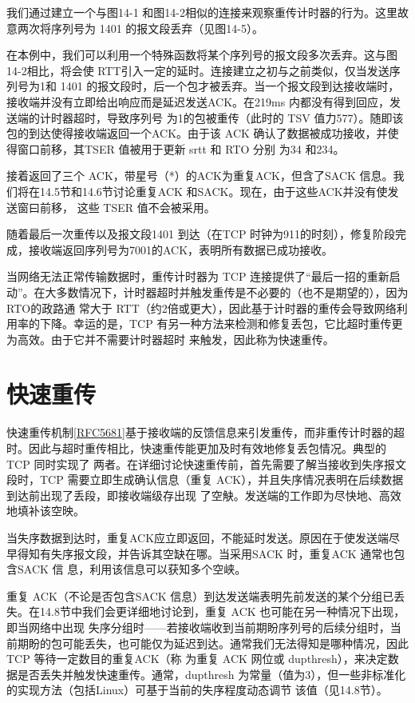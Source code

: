 我们通过建立一个与图14-1 和图14-2相似的连接来观察重传计时器的行为。这里故意两次将序列号为 1401 的报文段丢弃（见图14-5）。

在本例中，我们可以利用一个特殊函数将某个序列号的报文段多次丢弃。这与图14-2相比，将会使 RTT引入一定的延时。连接建立之初与之前类似，仅当发送序列号为1和
1401 的报文段时，后一个包才被丢弃。当一个报文段到达接收端时，接收端并没有立即给出响应而是延迟发送ACK。在219ms
内都没有得到回应，发送端的计时器超时，导致序列号
为1的包被重传（此时的 TSV 值力577）。随即该包的到达使得接收端返回一个ACK。由于该 ACK
确认了数据被成功接收，并使得窗口前移，其TSER 值被用于更新 srtt 和 RTO 分别
为34 和234。

接着返回了三个 ACK，带星号（*）的ACK为重复ACK，但含了SACK 信息。我们将在14.5节和14.6节讨论重复ACK
和SACK。现在，由于这些ACK并没有使发送窗曰前移，
这些 TSER 值不会被采用。

随着最后一次重传以及报文段1401 到达（在TCP 时钟为911的时刻），修复阶段完成，接收端返回序列号为7001的ACK，表明所有数据已成功接收。

当网络无法正常传输数据时，重传计时器为 TCP
连接提供了“最后一招的重新启动”。在大多数情况下，计时器超时并触发重传是不必要的（也不是期望的），因为RTO的政路通
常大于 RTT（约2倍或更大），因此基于计时器的重传会导致网络利用率的下降。幸运的是，TCP
有另一种方法来检测和修复丢包，它比超时重传更为高效。由于它并不需要计时器超时
来触发，因此称为快速重传。

\section{快速重传}
快速重传机制\href{https://www.rfc-editor.org/rfc/rfc5681}{[RFC5681]}基于接收端的反馈信息来引发重传，而非重传计时器的超时。因此与超时重传相比，快速重传能更加及时有效地修复丢包情况。典型的TCP
同时实现了
两者。在详细讨论快速重传前，首先需要了解当接收到失序报文段时，TCP 需要立即生成确认信息（重复
ACK），并且失序情况表明在后续数据到达前出现了丢段，即接收端级存出现
了空觖。发送端的工作即为尽快地、高效地填补该空映。

当失序数据到达时，重复ACK应立即返回，不能延时发送。原因在于使发送端尽早得知有失序报文段，并告诉其空缺在哪。当采用SACK
时，重复ACK 通常也包含SACK 信
息，利用该信息可以获知多个空峡。

重复 ACK（不论是否包含SACK 信息）到达发送端表明先前发送的某个分组已丢失。在14.8节中我们会更详细地讨论到，重复 ACK
也可能在另一种情况下出现，即当网络中出现
失序分组时——若接收端收到当前期盼序列号的后续分组时，当前期盼的包可能丢失，也可能仅为延迟到达。通常我们无法得知是哪种情况，因此TCP
等待一定数目的重复ACK（称
为重复 ACK 网位或 dupthresh），来决定数据是否丢失并触发快速重传。通常，dupthresh
为常量（值为3），但一些非标准化的实现方法（包括Linux）可基于当前的失序程度动态调节
该值（见14.8节）。

